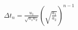 \documentclass[border=2.5pt]{standalone}
\begin{document}
$\displaystyle \boxed{\Delta t_n=\frac{u_1}{\sqrt{a_1a_2}}\left(\sqrt{\frac{a_1}{a_2}}\right)^{n-1}}$
\end{document}
